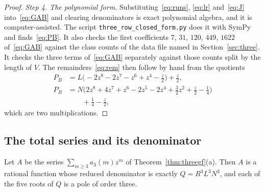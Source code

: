 \begin{proof}
\emph{Step 4. The polynomial form.} Substituting~\eqref{eq:runs}, \eqref{eq:lr}
and~\eqref{eq:J} into~\eqref{eq:GAB} and clearing denominators is exact polynomial algebra,
and it is computer-assisted. The script \texttt{three\_row\_closed\_form.py} does it with
SymPy and finds~\eqref{eq:PB}. It also checks the first coefficients $7$, $31$, $120$, $449$,
$1622$ of~\eqref{eq:GAB} against the class counts of the data file named in
Section~\ref{sec:three}. It checks the three terms of~\eqref{eq:GAB} separately against those
counts split by the length of $V$. The remainders~\eqref{eq:rem} then follow by hand from
the quotients
\begin{align*}
P_B&=L\bigl(-2z^8-2z^7-z^6+z^4-\tfrac z2\bigr)+\tfrac z2,\\
P_B&=N\bigl(2z^8+4z^7+z^6-2z^5-2z^4+\tfrac32z^2+\tfrac z2-\tfrac14\bigr)\\
&\qquad+\tfrac14-\tfrac z2,
\end{align*}
which are two multiplications.
\end{proof}

\subsection{The total series and its denominator}

\begin{theorem}\label{thm:denominator}
Let $A$ be the series $\sum_{m\ge3}a_3(m)z^m$ of Theorem~\ref{thm:threegf}(a). Then $A$ is a
rational function whose reduced denominator is exactly $Q=R^3L^3N^3$, and each of the five
roots of $Q$ is a pole of order three.
\end{theorem}

